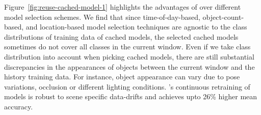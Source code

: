 {Figure~\ref{fig:reuse-cached-model-1} highlights the advantages of \name over different model selection schemes. 
We find that since time-of-day-based, object-count-based, and location-based model selection techniques are agnostic to the class distributions of training data of cached models, the selected cached models sometimes do not cover all classes in the current window. 
Even if we take class distribution into account when picking cached models, there are still substantial discrepancies in the appearances of objects between the current window and the history training data. %
For instance, object appearance can vary due to pose variations, occlusion or different lighting conditions. 
 \name's continuous retraining of models is robust to scene specific data-drifts and achieves upto 26\% higher mean accuracy.}

